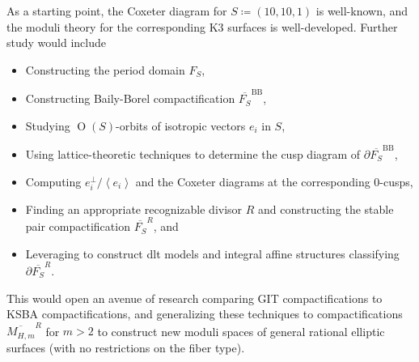 \documentclass{amsart}
\providecommand{\tightlist}{%
  \setlength{\itemsep}{0pt}\setlength{\parskip}{0pt}}
\begin{document}
As a starting point, the Coxeter diagram for \(S \coloneqq(10, 10, 1)\) is well-known, and the moduli theory for the corresponding K3 surfaces is well-developed. Further study would include

\begin{itemize}
\tightlist
\item
  Constructing the period domain \(F_{S}\),
\item
  Constructing Baily-Borel compactification \(\overline{F_{S}}^{\operatorname{BB}}\),
\item
  Studying \({\operatorname{O}}(S)\)-orbits of isotropic vectors \(e_i\) in \(S\),
\item
  Using lattice-theoretic techniques to determine the cusp diagram of \(\partial \overline{ F_{S}}^{\operatorname{BB}}\),
\item
  Computing \(e_i^\perp/\left\langle{e_i}\right\rangle\) and the Coxeter diagrams at the corresponding 0-cusps,
\item
  Finding an appropriate recognizable divisor \(R\) and constructing the stable pair compactification \(\overline{F_S}^R\), and
\item
  Leveraging \cite{AE22nonsympinv} to construct dlt models and integral affine structures classifying \(\partial\overline{F_S}^R\).
\end{itemize}

This would open an avenue of research comparing GIT compactifications to KSBA compactifications, and generalizing these techniques to compactifications \(\overline{M_{H, m}}^R\) for \(m > 2\) to construct new moduli spaces of general rational elliptic surfaces (with no restrictions on the fiber type).

\printbibliography %
\end{document}
